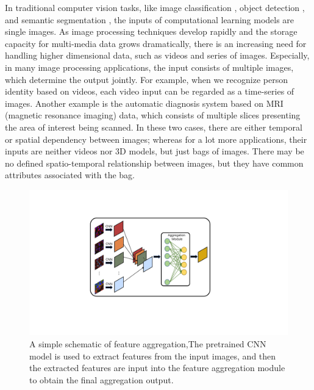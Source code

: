 \documentclass[10pt,twocolumn,letterpaper]{article}
\begin{document}
In traditional computer vision tasks, like image classification \cite{ref1, ref2, ref3}, object detection \cite{ref4, ref5}, and semantic segmentation \cite{ref6, ref7}, the inputs of computational learning models are single images. As image processing techniques develop rapidly and the storage capacity for multi-media data grows dramatically, there is an increasing need for handling higher dimensional data, such as videos and series of images. Especially, in many image processing applications, the input consists of multiple images, which determine the output jointly. For example, when we recognize person identity based on videos, each video input can be regarded as a time-series of images. Another example is the automatic diagnosis system based on MRI (magnetic resonance imaging) data, which consists of multiple slices presenting the area of interest being scanned. In these two cases, there are either temporal or spatial dependency between images; whereas for a lot more applications, their inputs are neither videos nor 3D models, but just bags of images. There may be no defined spatio-temporal relationship between images, but they have common attributes associated with the bag. %

\begin{figure}[t]
\begin{center}
 \includegraphics[width=0.8\linewidth]{introduction.pdf}
\end{center}
  \caption{A simple schematic of feature aggregation,The pretrained CNN model is used to extract features from the input images, and then the extracted features are input into the feature aggregation module to obtain the final aggregation output. }
\label{fig:long}
\label{fig:onecol}
\end{figure}
\end{document}
